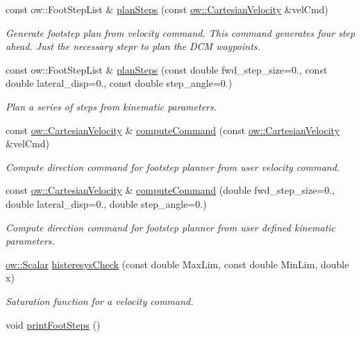 \begin{DoxyCompactItemize}
\item 
const ow\+::\+Foot\+Step\+List \& \hyperlink{classow__fs__planner_1_1FootstepPlanner_aefad97eb1919dcd3173080446ff4ecde}{plan\+Steps} (const \hyperlink{classow__core_1_1CartesianVelocity}{ow\+::\+Cartesian\+Velocity} \&vel\+Cmd)
\begin{DoxyCompactList}\small\item\em Generate footstep plan from velocity command. This command generates four step ahead. Just the necessary stepr to plan the D\+CM waypoints. \end{DoxyCompactList}\item 
const ow\+::\+Foot\+Step\+List \& \hyperlink{classow__fs__planner_1_1FootstepPlanner_ac4d96253fc47ce53f2d3a7707d4faa30}{plan\+Steps} (const double fwd\+\_\+step\+\_\+size=0., const double lateral\+\_\+disp=0., const double step\+\_\+angle=0.)
\begin{DoxyCompactList}\small\item\em Plan a series of steps from kinematic parameters. \end{DoxyCompactList}\item 
const \hyperlink{classow__core_1_1CartesianVelocity}{ow\+::\+Cartesian\+Velocity} \& \hyperlink{classow__fs__planner_1_1FootstepPlanner_a39955b9acc1dd9b8cdbf05d7f2209839}{compute\+Command} (const \hyperlink{classow__core_1_1CartesianVelocity}{ow\+::\+Cartesian\+Velocity} \&vel\+Cmd)
\begin{DoxyCompactList}\small\item\em Compute direction command for footstep planner from user velocity command. \end{DoxyCompactList}\item 
const \hyperlink{classow__core_1_1CartesianVelocity}{ow\+::\+Cartesian\+Velocity} \& \hyperlink{classow__fs__planner_1_1FootstepPlanner_ac0c2906947e69181360a4701739da499}{compute\+Command} (double fwd\+\_\+step\+\_\+size=0., double lateral\+\_\+disp=0., double step\+\_\+angle=0.)
\begin{DoxyCompactList}\small\item\em Compute direction command for footstep planner from user defined kinematic parameters. \end{DoxyCompactList}\item 
\hyperlink{types_8h_ac412879ee4a239c8032aa2d647f4a74a}{ow\+::\+Scalar} \hyperlink{classow__fs__planner_1_1FootstepPlanner_a87f334479a4d1fe0616d3a7d4ac15a47}{histeresys\+Check} (const double Max\+Lim, const double Min\+Lim, double x)
\begin{DoxyCompactList}\small\item\em Saturation function for a velocity command. \end{DoxyCompactList}\item 
void \hyperlink{classow__fs__planner_1_1FootstepPlanner_ab40afe151d6c9b15acc3cc15462c87d7}{print\+Foot\+Steps} ()\hypertarget{classow__fs__planner_1_1FootstepPlanner_ab40afe151d6c9b15acc3cc15462c87d7}{}\label{classow__fs__planner_1_1FootstepPlanner_ab40afe151d6c9b15acc3cc15462c87d7}


\end{DoxyCompactItemize}
